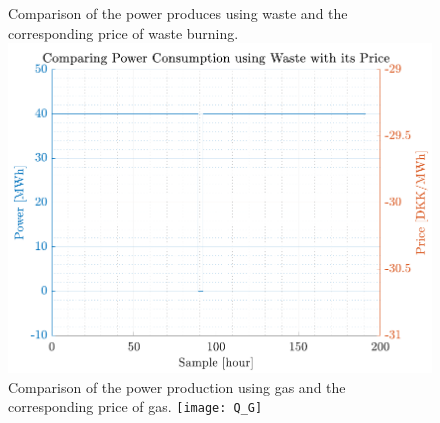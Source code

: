 \begin{figure}[H]
    \captionbox
    {       
        Comparison of the power produces using waste and the corresponding price of waste burning.          
        \label{fig:Q_W}                                  
    }                                                                 
    {                                                                  
        \includegraphics[height=.37\textwidth]{figures/Q_W} 
    }                                                                    
    \hspace{5pt}                                                          
    \captionbox  
    {          
        Comparison of the power production using gas and the corresponding price of gas.                                                      
        \label{fig:Q_G}                                     
    }                                                                     
    {                                                                     
        \texttt{[image: Q\_G]}            
    }      
\end{figure}


